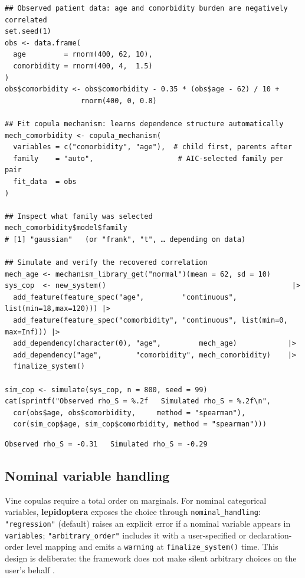 \documentclass[12pt,a4paper]{article}
\newcommand{\pkg}[1]{\textbf{#1}}
\newcommand{\code}[1]{\texttt{#1}}
\newcommand{\fct}[1]{\mbox{\texttt{#1()}}}
\begin{document}
\begin{tcolorbox}[codebox, title={\small\textbf{R} code --- vine copula mechanism}]
\begin{verbatim}
## Observed patient data: age and comorbidity burden are negatively correlated
set.seed(1)
obs <- data.frame(
  age         = rnorm(400, 62, 10),
  comorbidity = rnorm(400, 4,  1.5)
)
obs$comorbidity <- obs$comorbidity - 0.35 * (obs$age - 62) / 10 +
                  rnorm(400, 0, 0.8)

## Fit copula mechanism: learns dependence structure automatically
mech_comorbidity <- copula_mechanism(
  variables = c("comorbidity", "age"),  # child first, parents after
  family    = "auto",                    # AIC-selected family per pair
  fit_data  = obs
)

## Inspect what family was selected
mech_comorbidity$model$family
# [1] "gaussian"   (or "frank", "t", … depending on data)

## Simulate and verify the recovered correlation
mech_age <- mechanism_library_get("normal")(mean = 62, sd = 10)
sys_cop  <- new_system()                                            |>
  add_feature(feature_spec("age",         "continuous", list(min=18,max=120))) |>
  add_feature(feature_spec("comorbidity", "continuous", list(min=0, max=Inf))) |>
  add_dependency(character(0), "age",         mech_age)            |>
  add_dependency("age",        "comorbidity", mech_comorbidity)    |>
  finalize_system()

sim_cop <- simulate(sys_cop, n = 800, seed = 99)
cat(sprintf("Observed rho_S = %.2f   Simulated rho_S = %.2f\n",
  cor(obs$age, obs$comorbidity,     method = "spearman"),
  cor(sim_cop$age, sim_cop$comorbidity, method = "spearman")))
\end{verbatim}
\end{tcolorbox}

\begin{tcolorbox}[outputbox, title={\small Output}]
\begin{verbatim}
Observed rho_S = -0.31   Simulated rho_S = -0.29
\end{verbatim}
\end{tcolorbox}

\subsection{Nominal variable handling}
\label{sec:nominal}

Vine copulas require a total order on marginals. For nominal categorical variables,
\pkg{lepidoptera} exposes the choice through \code{nominal\_handling}:
\code{"regression"} (default) raises an explicit error if a nominal variable
appears in \code{variables}; \code{"arbitrary\_order"} includes it with a
user-specified or declaration-order level mapping and emits a \code{warning} at
\fct{finalize\_system} time. This design is deliberate: the framework does not
make silent arbitrary choices on the user's behalf \citep{pearl2009causality}.
\end{document}
